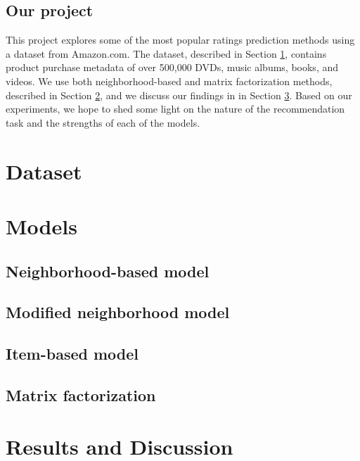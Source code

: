 \documentclass[letterpaper, 10 pt, conference]{ieeeconf}
\begin{document}
\subsection{Our project}
This project explores some of the most popular ratings prediction methods using 
a dataset from Amazon.com. The dataset, described in Section 
\ref{sec:dataset}, contains product purchase metadata of over 500,000 DVDs, 
music albums, books, and videos. We use both neighborhood-based and 
matrix factorization methods, described in Section \ref{sec:models}, and we 
discuss our findings in in Section \ref{sec:results}. Based on our 
experiments, we hope to shed some light on the nature of the recommendation 
task and the strengths of each of the models.


\section{Dataset}
\label{sec:dataset}



\section{Models}
\label{sec:models}

\subsection{Neighborhood-based model}
\subsection{Modified neighborhood model}
\subsection{Item-based model}
\subsection{Matrix factorization}

\section{Results and Discussion}
\label{sec:results}
\end{document}
